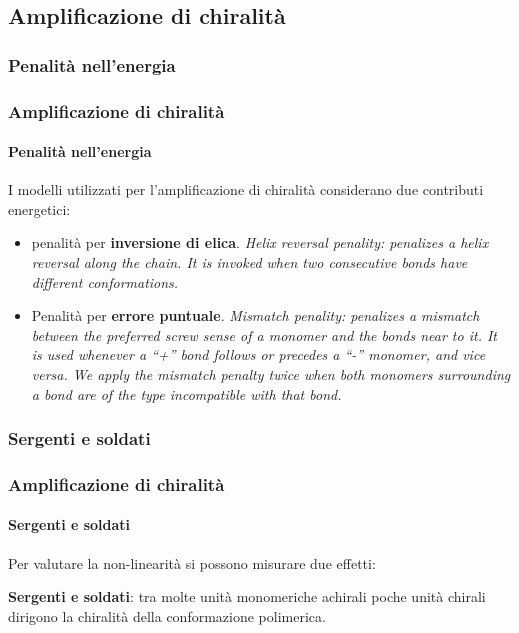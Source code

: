 \subsection{Amplificazione di chiralità}
\subsubsection{Penalità nell'energia}\begin{frame}\frametitle{Amplificazione di chiralità}\framesubtitle{Penalità nell'energia}

I modelli utilizzati per l'amplificazione di chiralità considerano due contributi energetici:
\begin{itemize}
 \item penalità per {\bf inversione di elica}. \emph{Helix reversal penality: penalizes a helix reversal along the chain. It is invoked when two consecutive bonds have different conformations.}

 \item Penalità per {\bf errore puntuale}. \emph{Mismatch penality: penalizes a mismatch between the preferred screw sense of a monomer and the bonds near to it. It is used
whenever a “+” bond follows or precedes a “-” monomer, and vice versa. We apply the mismatch penalty twice when both monomers surrounding a bond are of the type incompatible with that bond.  }\cite{def}
\end{itemize}
\end{frame}
\subsubsection{Sergenti e soldati}\begin{frame}\frametitle{Amplificazione di chiralità}\framesubtitle{Sergenti e soldati}
Per valutare la non-linearità si possono misurare due effetti:

{\bf Sergenti e soldati}: tra molte unità monomeriche achirali poche unità chirali dirigono la chiralità della conformazione polimerica.

\begin{figure}{}\end{figure}
\end{frame}

